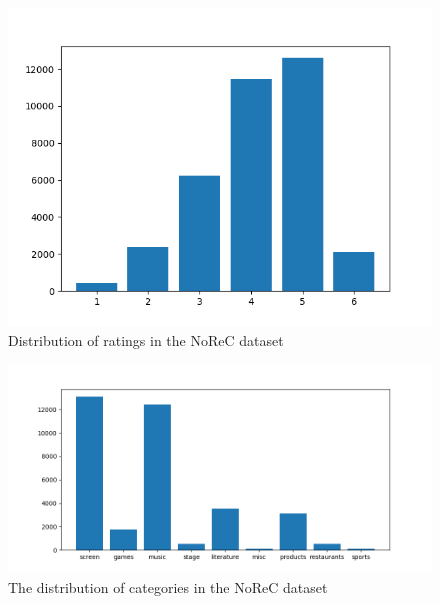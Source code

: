 \begin{figure}[h!]
	\centering
	\includegraphics[scale=0.5]{img/ratings}
	\caption{Distribution of ratings in the NoReC dataset}
	\label{fig:ratings}
\end{figure}%
\begin{figure}[h!]
	\centering
	\includegraphics[scale=0.5]{img/cat_dist}
	\caption{The distribution of categories in the NoReC dataset}
	\label{fig:cat_dist}
\end{figure}%
